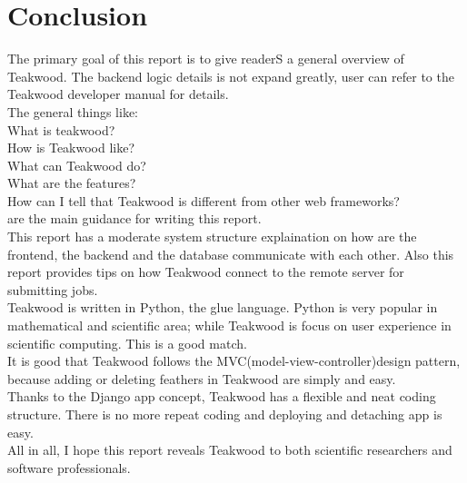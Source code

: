 \chapter{Conclusion}

The primary goal of this report is to give readerS a general overview of Teakwood. The backend logic details is not expand greatly, user can refer to the Teakwood developer manual for details.\\
The general things like:\\
What is teakwood?\\ 
How is Teakwood like? \\
What can Teakwood do?\\
What are the features?\\ 
How can I tell that Teakwood is different from other web frameworks?\\
are the main guidance for writing this report.\\

This report has a moderate system structure explaination on how are the frontend, the backend and the database communicate with each other. Also this report provides tips on how Teakwood connect to the remote server for submitting jobs.\\
Teakwood is written in Python, the glue language. Python is very popular in mathematical and scientific area; while Teakwood is focus on user experience in scientific computing. This is a good match. \\
It is good that Teakwood follows the MVC(model-view-controller)design pattern, because   adding or deleting feathers in Teakwood are simply and easy.\\
Thanks to the Django app concept, Teakwood has a flexible and neat coding structure.
There is no more repeat coding and deploying and detaching app is easy.\\

All in all, I hope this report reveals Teakwood to both scientific researchers and software professionals.